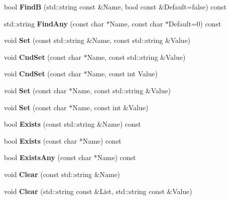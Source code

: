 \begin{DoxyCompactItemize}
\item 
bool {\bfseries \-Find\-B} (std\-::string const \&\-Name, bool const \&\-Default=false) const \label{classConfiguration_aa6e5fb38c30060990257624bda6e3960}

\item 
std\-::string {\bfseries \-Find\-Any} (const char $\ast$\-Name, const char $\ast$\-Default=0) const \label{classConfiguration_a1682075e96a38ce53067bc34d3edbb4b}

\item 
void {\bfseries \-Set} (const std\-::string \&\-Name, const std\-::string \&\-Value)\label{classConfiguration_a5c8d07c5cc53218a1b3fb3659128d5d3}

\item 
void {\bfseries \-Cnd\-Set} (const char $\ast$\-Name, const std\-::string \&\-Value)\label{classConfiguration_ae3d0ea4eb16eb609c544bb305ec0016e}

\item 
void {\bfseries \-Cnd\-Set} (const char $\ast$\-Name, const int \-Value)\label{classConfiguration_a38668d470479b51d926069ba2294e091}

\item 
void {\bfseries \-Set} (const char $\ast$\-Name, const std\-::string \&\-Value)\label{classConfiguration_a51dd0c6878731bdf68eea3e31a214b52}

\item 
void {\bfseries \-Set} (const char $\ast$\-Name, const int \&\-Value)\label{classConfiguration_a698036176655aadb406228c39780c5e0}

\item 
bool {\bfseries \-Exists} (const std\-::string \&\-Name) const \label{classConfiguration_a0812b41f51d492c3b873dccbd7e8df0e}

\item 
bool {\bfseries \-Exists} (const char $\ast$\-Name) const \label{classConfiguration_aff619979652f706bf8342bb05055bc43}

\item 
bool {\bfseries \-Exists\-Any} (const char $\ast$\-Name) const \label{classConfiguration_a940c54d2f08a52a25166021ce2be40ba}

\item 
void {\bfseries \-Clear} (const std\-::string \&\-Name)\label{classConfiguration_ac6219214a423e6371727e1794b25bf33}

\item 
void {\bfseries \-Clear} (std\-::string const \&\-List, std\-::string const \&\-Value)\label{classConfiguration_a248ff420b60b5b6e8f1bf8443b64b4ac}


\end{DoxyCompactItemize}
